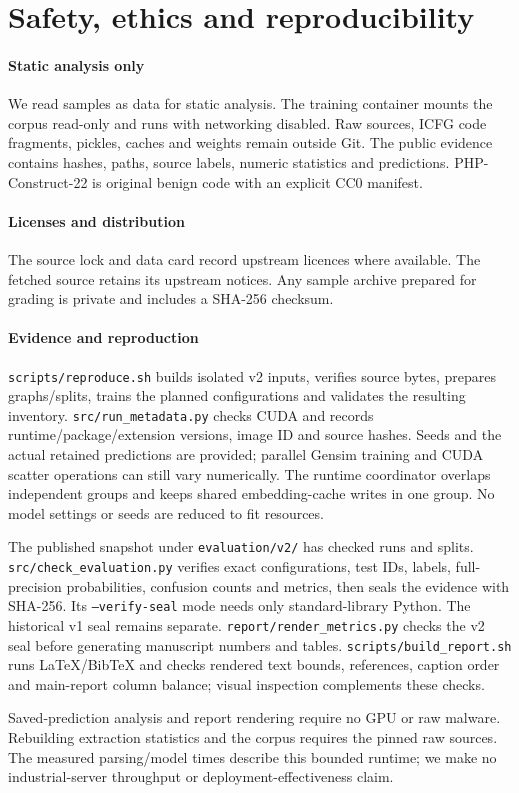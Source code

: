 \section{Safety, ethics and reproducibility}\label{sec:ethics}
\paragraph{Static analysis only}
We read samples as data for static analysis. The training container mounts the corpus read-only and runs
with networking disabled. Raw sources, ICFG code fragments, pickles, caches and
weights remain outside Git. The public evidence contains hashes, paths, source labels, numeric statistics and
predictions. PHP-Construct-22 is original benign code with an explicit CC0 manifest.

\paragraph{Licenses and distribution}
The source lock and data card record upstream licences where available. The fetched source retains its
upstream notices. Any sample archive prepared for grading is private and includes a SHA-256 checksum.

\paragraph{Evidence and reproduction}
\texttt{scripts/reproduce.sh} builds isolated v2 inputs, verifies source bytes, prepares graphs/splits, trains the
planned configurations and validates the resulting inventory. \texttt{src/run\_metadata.py} checks CUDA and records
runtime/package/extension versions, image ID and source hashes. Seeds and the actual retained predictions are
provided; parallel Gensim training and CUDA scatter operations can still vary numerically.
The runtime coordinator overlaps independent groups and keeps shared embedding-cache writes in one group.
No model settings or seeds are reduced to fit resources.

The published snapshot under \texttt{evaluation/v2/} has  checked runs and
 splits. \texttt{src/check\_evaluation.py} verifies exact configurations, test IDs, labels,
full-precision probabilities, confusion counts and metrics, then seals the evidence with SHA-256. Its
\texttt{--verify-seal} mode needs only standard-library Python. The historical v1 seal remains separate.
\texttt{report/render\_metrics.py} checks the v2 seal before generating manuscript numbers and tables.
\texttt{scripts/build\_report.sh} runs LaTeX/BibTeX and checks rendered text bounds, references, caption order and
main-report column balance; visual inspection complements these checks.

Saved-prediction analysis and report rendering require no GPU or raw malware. Rebuilding extraction statistics
and the corpus requires the pinned raw sources. The measured parsing/model times describe this bounded runtime;
we make no industrial-server throughput or deployment-effectiveness claim.
